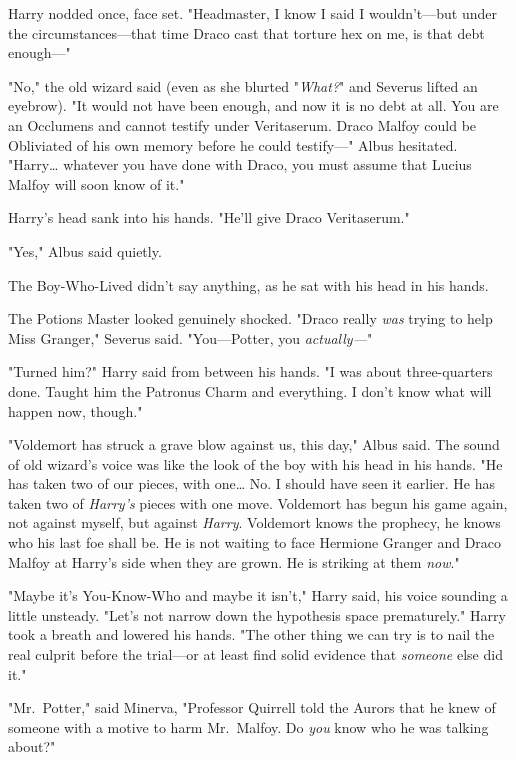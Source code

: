 Harry nodded once, face set. "Headmaster, I know I said I wouldn't---but under 
the circumstances---that time Draco cast that torture hex on me, is that debt 
enough---"

"No," the old wizard said (even as she blurted "\emph{What?}" and Severus 
lifted an eyebrow). "It would not have been enough, and now it is no debt at 
all. You are an Occlumens and cannot testify under Veritaserum. Draco Malfoy 
could be Obliviated of his own memory before he could testify---" Albus 
hesitated. "Harry{\ldots} whatever you have done with Draco, you must assume 
that Lucius Malfoy will soon know of it."

Harry's head sank into his hands. "He'll give Draco Veritaserum."

"Yes," Albus said quietly.

The Boy-Who-Lived didn't say anything, as he sat with his head in his hands.

The Potions Master looked genuinely shocked. "Draco really \emph{was} trying to 
help Miss Granger," Severus said. "You---Potter, you \emph{actually---}"

"Turned him?" Harry said from between his hands. "I was about three-quarters 
done. Taught him the Patronus Charm and everything. I don't know what will 
happen now, though."

"Voldemort has struck a grave blow against us, this day," Albus said. The sound 
of old wizard's voice was like the look of the boy with his head in his hands. 
"He has taken two of our pieces, with one{\ldots} No. I should have seen it 
earlier. He has taken two of \emph{Harry's} pieces with one move. Voldemort has 
begun his game again, not against myself, but against \emph{Harry}. Voldemort 
knows the prophecy, he knows who his last foe shall be. He is not waiting to 
face Hermione Granger and Draco Malfoy at Harry's side when they are grown. He 
is striking at them \emph{now}."

"Maybe it's You-Know-Who and maybe it isn't," Harry said, his voice sounding a 
little unsteady. "Let's not narrow down the hypothesis space prematurely." 
Harry took a breath and lowered his hands. "The other thing we can try is to 
nail the real culprit before the trial---or at least find solid evidence that 
\emph{someone} else did it."

"Mr.~Potter," said Minerva, "Professor Quirrell told the Aurors that he knew of 
someone with a motive to harm Mr.~Malfoy. Do \emph{you} know who he was talking 
about?"

